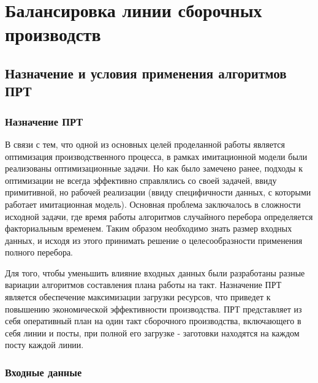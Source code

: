 \chapter{Балансировка линии сборочных производств}


\section{Назначение и условия применения алгоритмов ПРТ}
\subsection{Назначение ПРТ}
В связи с тем, что одной из основных целей проделанной работы является оптимизация производственного процесса, в рамках имитационной модели были реализованы оптимизационные задачи. Но как было замечено ранее, подходы к оптимизации не всегда эффективно справлялись со своей задачей, ввиду примитивной, но рабочей реализации (ввиду специфичности данных, с которыми работает имитационная модель). Основная проблема заключалось в сложности исходной задачи, где время работы алгоритмов случайного перебора определяется факториальным временем. Таким образом необходимо знать размер входных данных, и исходя из этого принимать решение о целесообразности применения полного перебора.

Для того, чтобы уменьшить влияние входных данных были разработаны разные вариации алгоритмов составления плана работы на такт. Назначение ПРТ является обеспечение максимизации загрузки ресурсов, что приведет к повышению экономической эффективности производства. ПРТ представляет из себя оперативный план на один такт сборочного производства, включающего в себя линии и посты, при полной его загрузке - заготовки находятся на каждом посту каждой линии.

\subsection{Входные данные}


